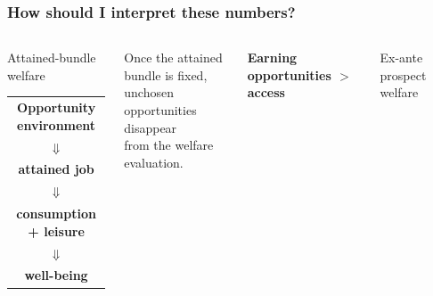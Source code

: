 \documentclass[10pt,aspectratio=169]{beamer}
\begin{document}

\begin{frame}[t]
\frametitle{How should I interpret these numbers?}
\hypertarget{main:interp}{}

\vspace{0.2em}

\begin{columns}[T,onlytextwidth]


\begin{block}{\centering Attained-bundle welfare}
\centering

\begin{center}
\begin{tabular}{c}
\textbf{Opportunity environment}\\[-0.2em]
{\Large$\Downarrow$}\\[-0.2em]
\textbf{attained job}\\[-0.2em]
{\Large$\Downarrow$}\\[-0.2em]
\textbf{consumption + leisure}\\[-0.2em]
{\Large$\Downarrow$}\\[-0.2em]
\textbf{well-being}
\end{tabular}
\end{center}
\end{block}

\vspace{0.25em}

\begin{center}
{\small
Once the attained bundle is fixed,\\
unchosen opportunities disappear\\
from the welfare evaluation.
}
\end{center}

\vspace{0.25em}

\begin{center}
\textcolor{chearn}{\textbf{Earning opportunities $>$ access}}
\end{center}


\begin{block}{\centering Ex-ante prospect welfare}
\centering


\end{block}
\end{columns}
\end{frame}
\end{document}
